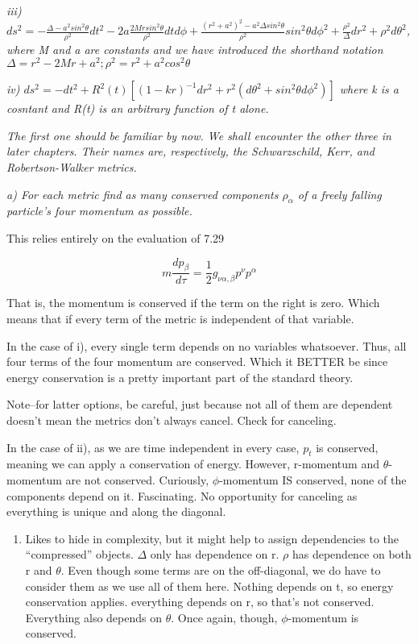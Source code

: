 \documentclass[landscape,letterpaper,10pt,english]{article}
\providecommand{\tightlist}{%
      \setlength{\itemsep}{0pt}\setlength{\parskip}{0pt}}
\begin{document}
\emph{iii)
\(ds^2 = -\frac{\Delta - a^2sin^2\theta}{\rho^2}dt^2 - 2a\frac{2Mrsin^2\theta}{\rho^2}dtd\phi + \frac{(r^2+a^2)^2-a^2\Delta sin^2\theta}{\rho^2}sin^2\theta d\phi^2 + \frac{\rho^2}{\Delta}dr^2 + \rho^2 d\theta^2\),
where M and a are constants and we have introduced the shorthand
notation \(\Delta = r^2-2Mr+a^2 ; \rho^2 = r^2+a^2cos^2\theta\)}

\emph{iv)
\(ds^2 = -dt^2 + R^2(t)[(1-kr)^{-1}dr^2 + r^2(d\theta^2 + sin^2\theta d\phi^2)]\)
where k is a cosntant and R(t) is an arbitrary function of t alone.}

\emph{The first one should be familiar by now. We shall encounter the
other three in later chapters. Their names are, respectively, the
Schwarzschild, Kerr, and Robertson-Walker metrics.}

\emph{a) For each metric find as many conserved components
\(\rho_\alpha\) of a freely falling particle's four momentum as
possible.}

    This relies entirely on the evaluation of 7.29

\[ m \frac{dp_\beta}{d\tau} = \frac12 g_{\nu\alpha,\beta} p^\nu p^\alpha\]

That is, the momentum is conserved if the term on the right is zero.
Which means that if every term of the metric is independent of that
variable.

In the case of i), every single term depends on no variables whatsoever.
Thus, all four terms of the four momentum are conserved. Which it BETTER
be since energy conservation is a pretty important part of the standard
theory.

Note--for latter options, be careful, just because not all of them are
dependent doesn't mean the metrics don't always cancel. Check for
canceling.

    In the case of ii), as we are time independent in every case, \(p_t\) is
conserved, meaning we can apply a conservation of energy. However,
r-momentum and \(\theta\)-momentum are not conserved. Curiously,
\(\phi\)-momentum IS conserved, none of the components depend on it.
Fascinating. No opportunity for canceling as everything is unique and
along the diagonal.

\begin{enumerate}
\def\labelenumi{\roman{enumi})}
\setcounter{enumi}{2}
\tightlist
\item
  Likes to hide in complexity, but it might help to assign dependencies
  to the ``compressed'' objects. \(\Delta\) only has dependence on r.
  \(\rho\) has dependence on both r and \(\theta\). Even though some
  terms are on the off-diagonal, we do have to consider them as we use
  all of them here. Nothing depends on t, so energy conservation
  applies. everything depends on r, so that's not conserved. Everything
  also depends on \(\theta\). Once again, though, \(\phi\)-momentum is
  conserved.
\end{enumerate}
\end{document}

